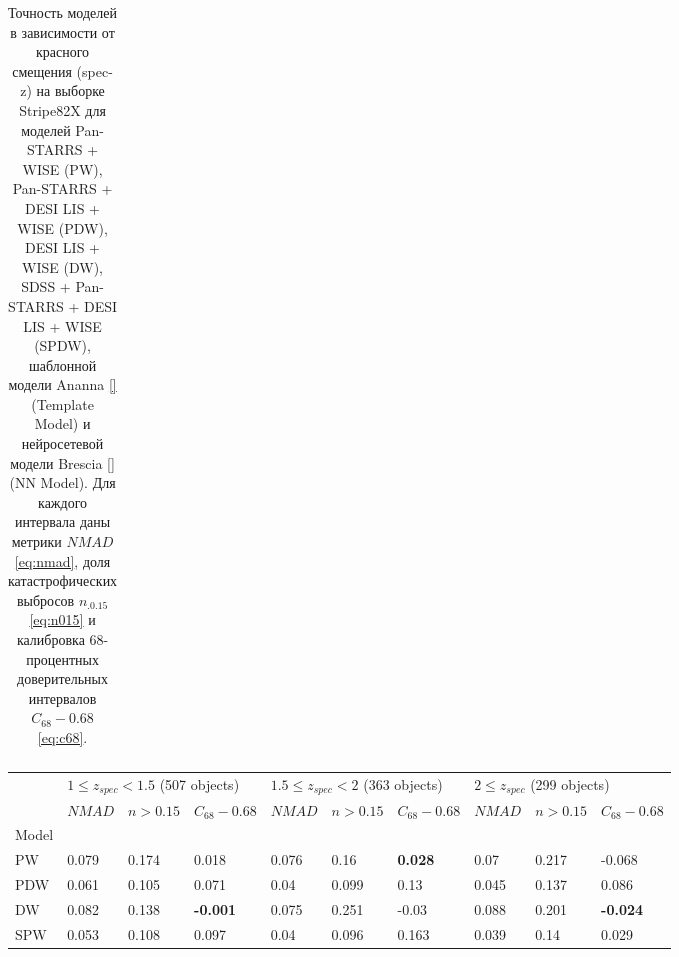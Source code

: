 \documentclass[fleqn,usenatbib]{mnras}
\begin{document}
\begin{table}
\begin{tabular}{llllllllll}
            \hline
            \end{tabular}
            \caption{Точность моделей в зависимости от красного смещения (spec-z) на выборке Stripe82X для моделей Pan-STARRS + WISE (PW), Pan-STARRS + DESI LIS + WISE (PDW), DESI LIS + WISE (DW), SDSS + Pan-STARRS + DESI LIS + WISE (SPDW), шаблонной модели Ananna \ref{} (Template Model) и нейросетевой модели Brescia \ref{} (NN Model). Для каждого интервала даны метрики $NMAD$ \eqref{eq:nmad}, доля катастрофических выбросов $n_{.0.15}$ \eqref{eq:n015} и калибровка 68-процентных доверительных интервалов $C_{68} - 0.68$ \eqref{eq:c68}.}
\end{table}

\begin{table}
	\begin{tabular}{llllllllll}
            \hline
            {} & \multicolumn{3}{l}{$1 \leq z_{spec} < 1.5$ (507 objects)} & \multicolumn{3}{l}{$1.5 \leq z_{spec} < 2$ (363 objects)} & \multicolumn{3}{l}{$2 \leq z_{spec}$ (299 objects)} \\
            {} &                                $NMAD$ &        $n>0.15$ &  $C_{68} - 0.68$ &                                $NMAD$ &        $n>0.15$ & $C_{68} - 0.68$ &                          $NMAD$ &        $n>0.15$ &  $C_{68} - 0.68$ \\
            Model          &                                       &                 &                  &                                       &                 &                 &                                 &                 &                  \\
            \hline
            PW             &                                 0.079 &           0.174 &            0.018 &                                 0.076 &            0.16 &  \textbf{0.028} &                            0.07 &           0.217 &           -0.068 \\
            PDW            &                                 0.061 &           0.105 &            0.071 &                                  0.04 &           0.099 &            0.13 &                           0.045 &           0.137 &            0.086 \\
            DW             &                                 0.082 &           0.138 &  \textbf{-0.001} &                                 0.075 &           0.251 &           -0.03 &                           0.088 &           0.201 &  \textbf{-0.024} \\
            SPW            &                                 0.053 &           0.108 &            0.097 &                                  0.04 &           0.096 &           0.163 &                           0.039 &            0.14 &            0.029 \\

\end{tabular}
\end{table}
\end{document}
